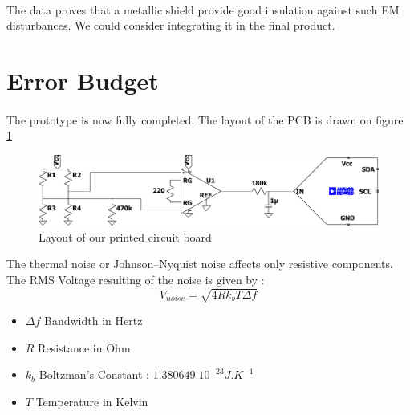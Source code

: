 \documentclass{article}[12pt]
\begin{document}
\paragraph{}
The data proves that a metallic shield provide good insulation against such EM disturbances. We could consider integrating it in the final product.
\section{Error Budget}
\paragraph{}
The prototype is now fully completed. The layout of the PCB is drawn on figure \ref{fig:layout}
\begin{figure}[H]
    \centering
    \includegraphics[width=\textwidth]{figures/layout.pdf}
    \caption{Layout of our printed circuit board}
    \label{fig:layout}
\end{figure}
The thermal noise or Johnson–Nyquist noise affects only resistive components. The RMS Voltage resulting of the noise is given by :
\begin{equation}
    V_{noise}=\sqrt{4Rk_bT\Delta f}
\end{equation}
\begin{itemize}
    \item $\Delta f$ Bandwidth in Hertz
    \item $R$ Resistance in Ohm
    \item $k_b$ Boltzman's Constant : $1.380649.10^{-23} J.K^{-1}$ 
    \item $T$ Temperature in Kelvin
\end{itemize}
\end{document}
